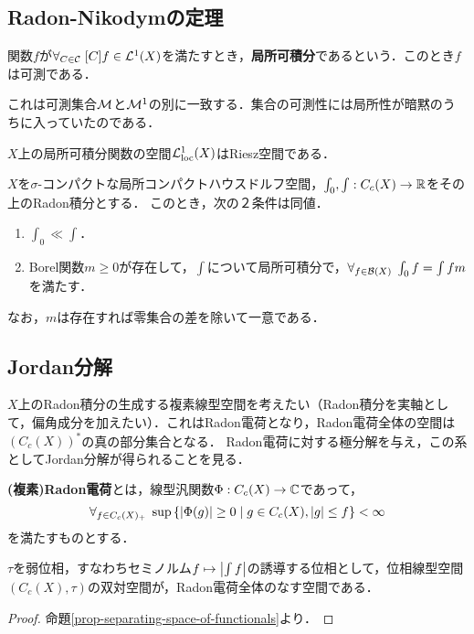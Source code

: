 \documentclass[uplatex,dvipdfmx]{jsreport}
\begin{document}
\subsection{Radon-Nikodymの定理}

\begin{definition}\label{def-locally-integrable-function}
    関数$f$が$\forall_{C\in\mathcal{C}}\;[C]f\in\mathcal{L}^1(X)$を満たすとき，\textbf{局所可積分}であるという．このとき$f$は可測である．
\end{definition}
\begin{remarks}
    これは可測集合$\mathcal{M}$と$\mathcal{M}^1$の別に一致する．集合の可測性には局所性が暗黙のうちに入っていたのである．
\end{remarks}

\begin{lemma}
    $X$上の局所可積分関数の空間$\mathcal{L}^1_{\mathrm{loc}}(X)$はRiesz空間である．
\end{lemma}

\begin{theorem}
    $X$を$\sigma$-コンパクトな局所コンパクトハウスドルフ空間，$\int_0,\int:C_c(X)\to\mathbb{R}$をその上のRadon積分とする．
    このとき，次の２条件は同値．
    \begin{enumerate}
        \item $\int_0\ll\int$．
        \item Borel関数$m\ge0$が存在して，$\int$について局所可積分で，$\forall_{f\in\mathcal{B}(X)}\;\int_0f=\int fm$を満たす．
    \end{enumerate}
    なお，$m$は存在すれば零集合の差を除いて一意である．
\end{theorem}

\subsection{Jordan分解}

\begin{tcolorbox}[colframe=ForestGreen, colback=ForestGreen!10!white,breakable,colbacktitle=ForestGreen!40!white,coltitle=black,fonttitle=\bfseries\sffamily,
title=]
    $X$上のRadon積分の生成する複素線型空間を考えたい（Radon積分を実軸として，偏角成分を加えたい）．これはRadon電荷となり，Radon電荷全体の空間は$(C_c(X))^*$の真の部分集合となる．
    Radon電荷に対する極分解を与え，この系としてJordan分解が得られることを見る．
\end{tcolorbox}

\begin{definition}
    \textbf{(複素)Radon電荷}とは，線型汎関数$\Phi:C_c(X)\to\mathbb{C}$であって，
    \[\forall_{f\in C_c(X)_+}\;\sup\left\{\lvert\Phi(g)\rvert\ge0\mid g\in C_c(X),\lvert g\rvert\le f\right\}<\infty\]
    を満たすものとする．
\end{definition}
\begin{lemma}[Radon電荷の抽象的特徴付け]
    $\tau$を弱位相，すなわちセミノルム$f\mapsto\left|\int f\right|$の誘導する位相として，位相線型空間$(C_c(X),\tau)$の双対空間が，Radon電荷全体のなす空間である．
\end{lemma}
\begin{proof}
    命題\ref{prop-separating-space-of-functionals}より．
\end{proof}
\end{document}
